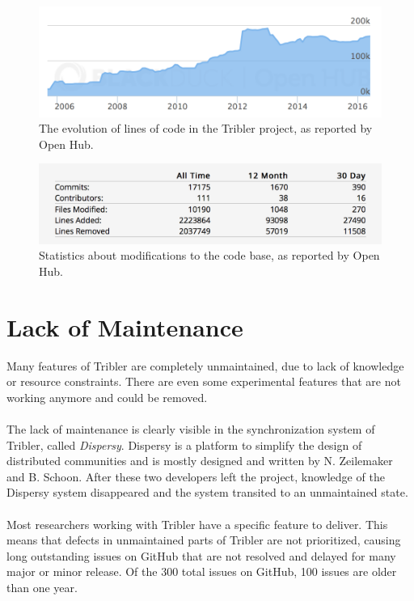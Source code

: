 \begin{figure}[!h]
	\centering
	\includegraphics[width=\columnwidth]{images/openhub_loc}
	\caption{The evolution of lines of code in the Tribler project, as reported by Open Hub.}
	\label{fig:openhub-loc}
\end{figure}

\begin{figure}[!h]
	\centering
	\includegraphics[width=0.7\columnwidth]{images/openhub_commits_table}
	\caption{Statistics about modifications to the code base, as reported by Open Hub.}
	\label{fig:openhub-commit-stats}
\end{figure}

\section{Lack of Maintenance}
Many features of Tribler are completely unmaintained, due to lack of knowledge or resource constraints. There are even some experimental features that are not working anymore and could be removed.\\\\
The lack of maintenance is clearly visible in the synchronization system of Tribler, called \emph{Dispersy}. Dispersy is a platform to simplify the design of distributed communities and is mostly designed and written by
N. Zeilemaker and B. Schoon\cite{zeilemaker2013dispersy}. After these two developers left the project, knowledge of the Dispersy system disappeared and the system transited to an unmaintained state.\\\\
Most researchers working with Tribler have a specific feature to deliver. This means that defects in unmaintained parts of Tribler are not prioritized, causing long outstanding issues on GitHub that are not resolved and delayed for many major or minor release. Of the 300 total issues on GitHub, 100 issues are older than one year.
 
